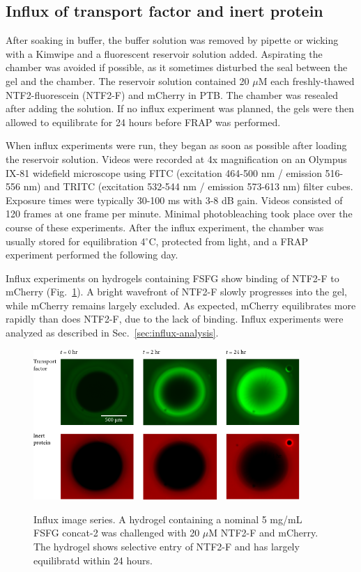 \subsection{Influx of transport factor and inert protein}
After soaking in buffer, the buffer solution was removed by pipette or wicking with a Kimwipe and a fluorescent reservoir solution added.  Aspirating the chamber was avoided if possible, as it sometimes disturbed the seal between the gel and the chamber.  The reservoir solution contained 20 $\mu$M each freshly-thawed NTF2-fluorescein (NTF2-F) and mCherry in PTB.  The chamber was resealed after adding the solution.  If no influx experiment was planned, the gels were then allowed to  equilibrate for 24 hours before FRAP was performed.

When influx experiments were run, they began as soon as possible after loading the reservoir solution.  Videos were recorded at 4x magnification on an Olympus IX-81 widefield microscope using FITC (excitation 464-500 nm / emission 516-556 nm) and TRITC (excitation 532-544 nm / emission 573-613 nm) filter cubes.  Exposure times were typically 30-100 ms with 3-8 dB gain.  Videos consisted of 120 frames at one frame per minute. Minimal photobleaching took place over the course of these experiments.  After the influx experiment, the chamber was usually stored for equilibration 4$^\circ$C, protected from light, and a FRAP experiment performed the following day.

Influx experiments on hydrogels containing FSFG show binding of NTF2-F to mCherry (Fig.~\ref{fig:influx-images}).  A bright wavefront  of NTF2-F slowly progresses into the gel, while mCherry remains largely excluded.  As expected, mCherry equilibrates more rapidly than does NTF2-F, due to the lack of binding.  Influx experiments were analyzed as described in Sec.~\ref{sec:influx-analysis}.

\begin{figure}
\caption{Influx image series.  A hydrogel containing a nominal 5 mg/mL FSFG concat-2 was challenged with 20 $\mu$M NTF2-F and mCherry.  The hydrogel shows selective entry of NTF2-F and has largely equilibratd within 24 hours.}
\centering
\includegraphics[width=0.9\textwidth]{figs/ch04/influx-images-clean.pdf}
\label{fig:influx-images}
\end{figure} 

